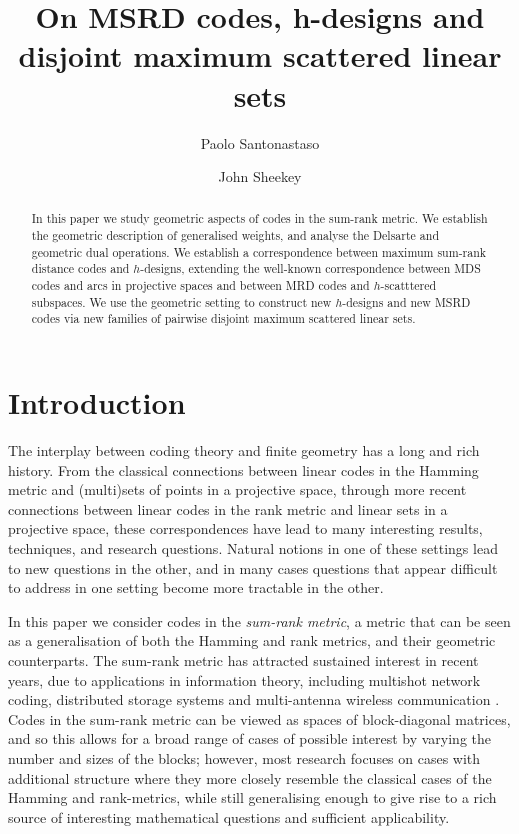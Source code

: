 \documentclass[11pt]{amsart}
\title{On MSRD codes, \lowercase{h}-designs and disjoint maximum scattered linear sets}
\date{}
\author[P. Santonastaso]{Paolo Santonastaso}
\author[J. Sheekey]{John Sheekey}
\theoremstyle{definition}
\begin{document}
\maketitle

\begin{abstract}
In this paper we study geometric aspects of codes in the sum-rank metric. We establish the geometric description of generalised weights, and analyse the Delsarte and geometric dual operations. We establish a correspondence between maximum sum-rank distance codes and $h$-designs, extending the well-known correspondence between MDS codes and arcs in projective spaces and between MRD codes and $h$-scatttered subspaces. We use the geometric setting to construct new  $h$-designs and new MSRD codes via new families of pairwise disjoint maximum scattered linear sets. 

\end{abstract}

    
  

\section{Introduction}


The interplay between coding theory and finite geometry has a long and rich history. From the classical connections between linear codes in the Hamming metric and (multi)sets of points in a projective space, through more recent connections between linear codes in the rank metric and linear sets in a projective space, these correspondences have lead to many interesting results, techniques, and research questions. Natural notions in one of these settings lead to new questions in the other, and in many cases questions that appear difficult to address in one setting become more tractable in the other.

In this paper we consider codes in the {\it sum-rank metric}, a metric that can be seen as a generalisation of both the Hamming and rank metrics, and their geometric counterparts. The sum-rank metric has attracted sustained interest in recent years, due to applications in information theory, including multishot network coding, distributed storage systems and multi-antenna wireless communication \cite{martinez2022survey}. Codes in the sum-rank metric can be viewed as spaces of block-diagonal matrices, and so this allows for a broad range of cases of possible interest by varying the number and sizes of the blocks; however, most research focuses on cases with additional structure where they more closely resemble the classical cases of the Hamming and rank-metrics, while still generalising enough to give rise to a rich source of interesting mathematical questions and sufficient applicability. 
\end{document}
